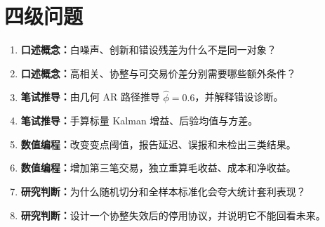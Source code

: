 \section{四级问题}
\begin{enumerate}[leftmargin=*]
  \item \textbf{口述概念：}白噪声、创新和错设残差为什么不是同一对象？
  \item \textbf{口述概念：}高相关、协整与可交易价差分别需要哪些额外条件？
  \item \textbf{笔试推导：}由几何 AR 路径推导 $\widehat\phi=0.6$，并解释错设诊断。
  \item \textbf{笔试推导：}手算标量 Kalman 增益、后验均值与方差。
  \item \textbf{数值编程：}改变变点阈值，报告延迟、误报和未检出三类结果。
  \item \textbf{数值编程：}增加第三笔交易，独立重算毛收益、成本和净收益。
  \item \textbf{研究判断：}为什么随机切分和全样本标准化会夸大统计套利表现？
  \item \textbf{研究判断：}设计一个协整失效后的停用协议，并说明它不能回看未来。
\end{enumerate}

